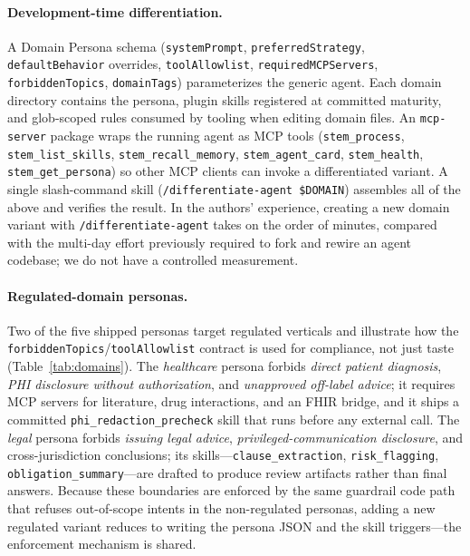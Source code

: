 \documentclass[11pt]{article}
\begin{document}
\paragraph{Development-time differentiation.} A Domain Persona schema (\texttt{systemPrompt}, \texttt{preferredStrategy}, \texttt{defaultBehavior} overrides, \texttt{toolAllowlist}, \texttt{requiredMCPServers}, \texttt{forbiddenTopics}, \texttt{domainTags}) parameterizes the generic agent. Each domain directory contains the persona, plugin skills registered at committed maturity, and glob-scoped rules consumed by tooling when editing domain files. An \texttt{mcp-server} package wraps the running agent as MCP tools (\texttt{stem\_process}, \texttt{stem\_list\_skills}, \texttt{stem\_recall\_memory}, \texttt{stem\_agent\_card}, \texttt{stem\_health}, \texttt{stem\_get\_persona}) so other MCP clients can invoke a differentiated variant. A single slash-command skill (\texttt{/differentiate-agent \$DOMAIN}) assembles all of the above and verifies the result. In the authors' experience, creating a new domain variant with \texttt{/differentiate-agent} takes on the order of minutes, compared with the multi-day effort previously required to fork and rewire an agent codebase; we do not have a controlled measurement.

\paragraph{Regulated-domain personas.} Two of the five shipped personas target regulated verticals and illustrate how the \texttt{forbiddenTopics}/\texttt{toolAllowlist} contract is used for compliance, not just taste (Table~\ref{tab:domains}). The \emph{healthcare} persona forbids \textit{direct patient diagnosis}, \textit{PHI disclosure without authorization}, and \textit{unapproved off-label advice}; it requires MCP servers for literature, drug interactions, and an FHIR bridge, and it ships a committed \texttt{phi\_redaction\_precheck} skill that runs before any external call. The \emph{legal} persona forbids \textit{issuing legal advice}, \textit{privileged-communication disclosure}, and cross-jurisdiction conclusions; its skills---\texttt{clause\_extraction}, \texttt{risk\_flagging}, \texttt{obligation\_summary}---are drafted to produce review artifacts rather than final answers. Because these boundaries are enforced by the same guardrail code path that refuses out-of-scope intents in the non-regulated personas, adding a new regulated variant reduces to writing the persona JSON and the skill triggers---the enforcement mechanism is shared.
\end{document}
